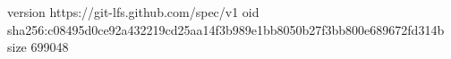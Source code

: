 version https://git-lfs.github.com/spec/v1
oid sha256:c08495d0ce92a432219cd25aa14f3b989e1bb8050b27f3bb800e689672fd314b
size 699048
